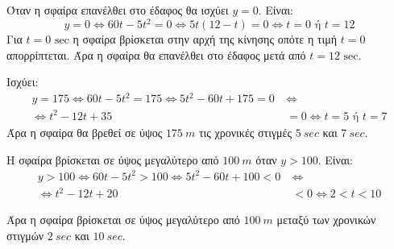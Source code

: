 
\begin{alist}
\item Όταν η σφαίρα επανέλθει στο έδαφος θα ισχύει $y = 0$. Είναι:
\[y = 0 \Leftrightarrow 60t - 5t^2 = 0 \Leftrightarrow 5t(12 - t) = 0 \Leftrightarrow t = 0 \text{ ή } t = 12\]
Για $t = 0\text{ sec}$ η σφαίρα βρίσκεται στην αρχή της κίνησης οπότε η τιμή $t = 0$ απορρίπτεται.
Άρα η σφαίρα θα επανέλθει στο έδαφος μετά από $t = 12\text{ sec}$.

\item Ισχύει:
\begin{align*}
y = 175 \Leftrightarrow 60t - 5t^2 = 175 \Leftrightarrow 5t^2 - 60t + 175 = 0 \ &\Leftrightarrow \\
\Leftrightarrow t^2 - 12t + 35 &= 0 \Leftrightarrow t = 5 \text{ ή } t = 7
\end{align*}
Άρα η σφαίρα θα βρεθεί σε ύψος $\SI{175}{m}$ τις χρονικές στιγμές $\SI{5}{sec}$ και $\SI{7}{sec}$.

\item Η σφαίρα βρίσκεται σε ύψος μεγαλύτερο από $\SI{100}{m}$ όταν $y > 100$. Είναι:
\begin{align*}
y > 100 \Leftrightarrow 60t - 5t^2 > 100 \Leftrightarrow 5t^2 - 60t + 100 < 0 \ &\Leftrightarrow \\
\Leftrightarrow t^2 - 12t + 20 &< 0 \Leftrightarrow 2 < t < 10
\end{align*}

Άρα η σφαίρα βρίσκεται σε ύψος μεγαλύτερο από $\SI{100}{m}$ μεταξύ των χρονικών στιγμών $\SI{2}{sec}$ και $\SI{10}{sec}$.
\end{alist}

